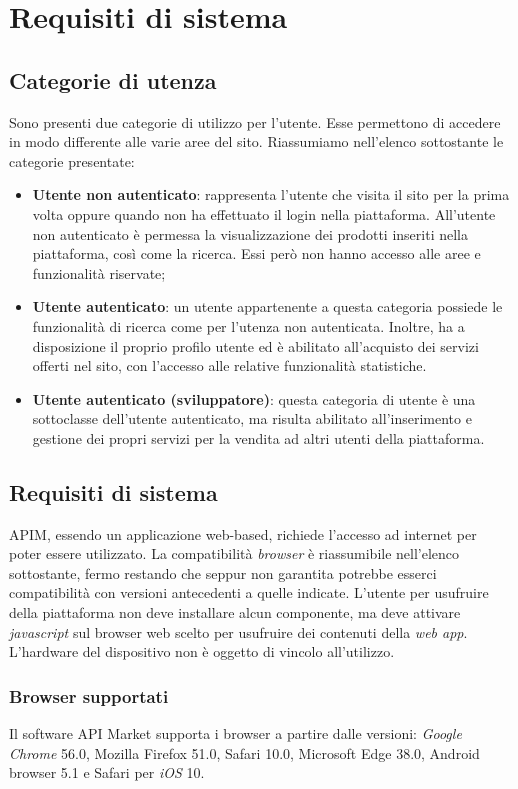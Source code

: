 \newpage
\section{Requisiti di sistema}

\subsection{Categorie di utenza}
Sono presenti due categorie di utilizzo per l'utente. Esse permettono di accedere in modo differente alle varie aree del sito. Riassumiamo nell'elenco sottostante le categorie presentate:

\begin{itemize}
	\item \textbf{Utente non autenticato}: rappresenta l'utente che visita il sito per la prima volta oppure quando non ha effettuato il login nella piattaforma. All'utente non autenticato è permessa la visualizzazione dei prodotti inseriti nella piattaforma, così come la ricerca. Essi però non hanno accesso alle aree e funzionalità riservate;
	\item \textbf{Utente autenticato}: un utente appartenente a questa categoria possiede le funzionalità di ricerca come per l'utenza non autenticata. Inoltre, ha a disposizione il proprio profilo utente ed è abilitato all'acquisto dei servizi offerti nel sito, con l'accesso alle relative funzionalità statistiche.
	\item \textbf{Utente autenticato (sviluppatore)}: questa categoria di utente è una sottoclasse dell'utente autenticato, ma risulta abilitato all'inserimento e gestione dei propri servizi per la vendita ad altri utenti della piattaforma. 
\end{itemize}

\subsection{Requisiti di sistema}
APIM, essendo un applicazione web-based, richiede l'accesso ad internet per poter essere utilizzato. La compatibilità \textit{browser} è riassumibile nell'elenco sottostante, fermo restando che seppur non garantita potrebbe esserci compatibilità con versioni antecedenti a quelle indicate. L'utente per usufruire della piattaforma non deve installare alcun componente, ma deve attivare \textit{javascript} sul browser web scelto per usufruire dei contenuti della \textit{web app}.
L'hardware del dispositivo non è oggetto di vincolo all'utilizzo.

\subsubsection{Browser supportati}
Il software API Market supporta i browser a partire dalle versioni: \textit{Google Chrome} 56.0, Mozilla Firefox 51.0, Safari 10.0, Microsoft Edge 38.0, Android browser 5.1 e Safari per \textit{iOS} 10.

